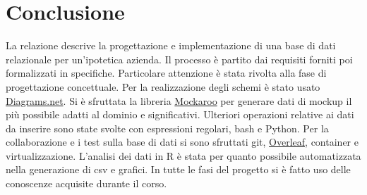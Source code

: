 \documentclass{article}
\begin{document}
\section{Conclusione}
La relazione descrive la progettazione e implementazione di una base di dati relazionale per un'ipotetica azienda.
\newline
Il processo è partito dai requisiti forniti poi formalizzati in specifiche.
\newline
Particolare attenzione è stata rivolta alla fase di progettazione concettuale.
\newline
Per la realizzazione degli schemi è stato usato \href{https://www.diagrams.net}{Diagrams.net}.
\newline
Si è sfruttata la libreria \href{https://www.mockaroo.com/docs}{Mockaroo} per generare dati di mockup il più possibile adatti al dominio e significativi.
\newline
Ulteriori operazioni relative ai dati da inserire sono state svolte con espressioni regolari, bash e Python.
\newline
Per la collaborazione e i test sulla base di dati si sono sfruttati git, \href{https://www.overleaf.com/}{Overleaf}, container e virtualizzazione.
\newline
L'analisi dei dati in R è stata per quanto possibile automatizzata nella generazione di csv e grafici.
\newline
\newline
In tutte le fasi del progetto si è fatto uso delle conoscenze acquisite durante il corso.
\end{document}
